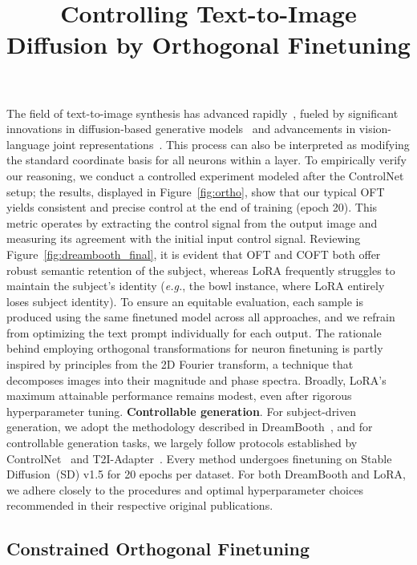 \title{Controlling Text-to-Image Diffusion by Orthogonal Finetuning}
The field of text-to-image synthesis has advanced rapidly~\cite{saharia2022photorealistic,ramesh2022hierarchical,rombach2022high,gu2022vector,nichol2022glide}, fueled by significant innovations in diffusion-based generative models~\cite{ho2020denoising,song2021score,song2021denoising,dhariwal2021diffusion} and advancements in vision-language joint representations~\cite{su2020vlbert,lu2019vilbert,radford2021learning,wang2021simvlm,li2022blip,li2023blip,alayrac2022flamingo,schuhmann2022laion}. This process can also be interpreted as modifying the standard coordinate basis for all neurons within a layer. To empirically verify our reasoning, we conduct a controlled experiment modeled after the ControlNet~\cite{zhang2023adding} setup; the results, displayed in Figure~\ref{fig:ortho}, show that our typical OFT yields consistent and precise control at the end of training (epoch 20). This metric operates by extracting the control signal from the output image and measuring its agreement with the initial input control signal. Reviewing Figure~\ref{fig:dreambooth_final}, it is evident that OFT and COFT both offer robust semantic retention of the subject, whereas LoRA frequently struggles to maintain the subject’s identity (\emph{e.g.}, the bowl instance, where LoRA entirely loses subject identity). To ensure an equitable evaluation, each sample is produced using the same finetuned model across all approaches, and we refrain from optimizing the text prompt individually for each output. The rationale behind employing orthogonal transformations for neuron finetuning is partly inspired by principles from the 2D Fourier transform, a technique that decomposes images into their magnitude and phase spectra. Broadly, LoRA's maximum attainable performance remains modest, even after rigorous hyperparameter tuning. \textbf{Controllable generation}. For subject-driven generation, we adopt the methodology described in DreamBooth~\cite{ruiz2023dreambooth}, and for controllable generation tasks, we largely follow protocols established by ControlNet~\cite{zhang2023adding} and T2I-Adapter~\cite{mou2023t2i}. Every method undergoes finetuning on Stable Diffusion~(SD) v1.5 for 20 epochs per dataset. For both DreamBooth and LoRA, we adhere closely to the procedures and optimal hyperparameter choices recommended in their respective original publications. \subsection{Constrained Orthogonal Finetuning}

